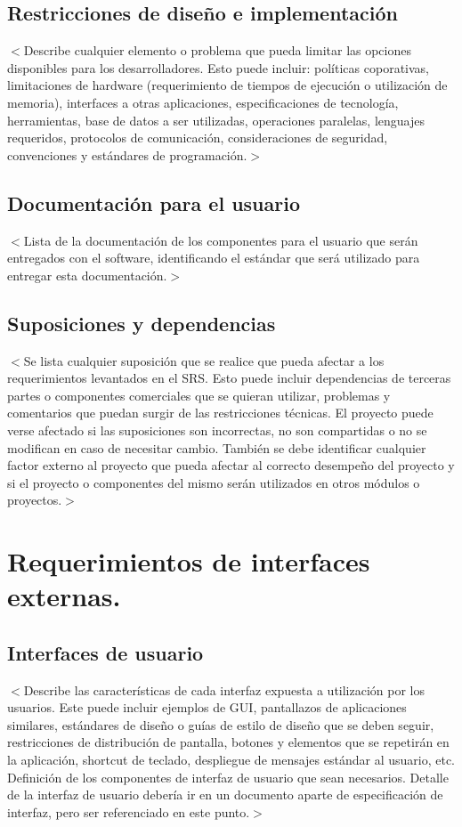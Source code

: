 \documentclass{scrreprt}
\begin{document}
\section{Restricciones de diseño e implementación}
$<$Describe cualquier elemento o problema que pueda limitar las opciones disponibles para los desarrolladores. Esto puede incluir: políticas coporativas, limitaciones de hardware (requerimiento de tiempos de ejecución o utilización de memoria), interfaces a otras aplicaciones, especificaciones de tecnología, herramientas, base de datos a ser utilizadas, operaciones paralelas, lenguajes requeridos, protocolos de comunicación, consideraciones de seguridad, convenciones y estándares de programación.$>$

\section{Documentación para el usuario}
$<$Lista de la documentación de los componentes para el usuario que serán entregados con el software, identificando el estándar que será utilizado para entregar esta documentación.$>$
\section{Suposiciones y dependencias}
$<$Se lista cualquier suposición que se realice que pueda afectar a los requerimientos levantados en el SRS. Esto puede incluir dependencias de terceras partes o componentes comerciales que se quieran utilizar, problemas y comentarios que puedan surgir de las restricciones técnicas. El proyecto puede verse afectado si las suposiciones son incorrectas, no son compartidas o no se modifican en caso de necesitar cambio. También se debe identificar cualquier factor externo al proyecto que pueda afectar al correcto desempeño del proyecto y si el proyecto o componentes del mismo serán utilizados en otros módulos o proyectos.$>$

\chapter{Requerimientos de interfaces externas.}

\section{Interfaces de usuario}
$<$Describe las características de cada interfaz expuesta a utilización por los usuarios. Este puede incluir ejemplos de GUI, pantallazos de aplicaciones similares, estándares de diseño o guías de estilo de diseño que se deben seguir, restricciones de distribución de pantalla, botones y elementos que se repetirán en la aplicación, shortcut de teclado, despliegue de mensajes estándar al usuario, etc. Definición de los componentes de interfaz de usuario que sean necesarios. Detalle de la interfaz de usuario debería ir en un documento aparte de especificación de interfaz, pero ser referenciado en este punto.$>$
\end{document}
